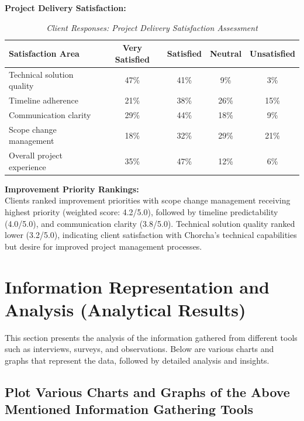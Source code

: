 \documentclass[12pt,a4paper,oneside]{book}
\begin{document}
\textbf{Project Delivery Satisfaction:}
\begin{table}[H]
\centering
\caption{\textit{Client Responses: Project Delivery Satisfaction Assessment}}
\begin{tabular}{|l|c|c|c|c|}
\hline
Satisfaction Area & Very Satisfied & Satisfied & Neutral & Unsatisfied \\
\hline
Technical solution quality & 47\% & 41\% & 9\% & 3\% \\
Timeline adherence & 21\% & 38\% & 26\% & 15\% \\
Communication clarity & 29\% & 44\% & 18\% & 9\% \\
Scope change management & 18\% & 32\% & 29\% & 21\% \\
Overall project experience & 35\% & 47\% & 12\% & 6\% \\
\hline
\end{tabular}
\end{table}

\textbf{Improvement Priority Rankings:}\\
Clients ranked improvement priorities with scope change management receiving highest priority (weighted score: 4.2/5.0), followed by timeline predictability (4.0/5.0), and communication clarity (3.8/5.0). Technical solution quality ranked lower (3.2/5.0), indicating client satisfaction with Chorcha’s technical capabilities but desire for improved project management processes.
\newpage

\section{Information Representation and Analysis (Analytical Results)}






This section presents the analysis of the information gathered from different tools such as interviews, surveys, and observations. Below are various charts and graphs that represent the data, followed by detailed analysis and insights.

\subsection{Plot Various Charts and Graphs of the Above Mentioned Information Gathering Tools}
\end{document}
